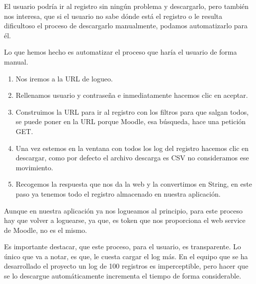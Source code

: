 El usuario podría ir al registro sin ningún problema y descargarlo, pero también nos interesa, que si el usuario no sabe dónde está el registro o le resulta dificultoso el proceso de descargarlo manualmente, podamos automatizarlo para él.
 
Lo que hemos hecho es automatizar el proceso que haría el usuario de forma manual. 
 \begin{enumerate}
 	\item 
 	Nos iremos a la URL de logueo.
 	\item 
 	Rellenamos usuario y contraseña e inmediatamente hacemos clic en aceptar.
 	\item 
 	Construimos la URL para ir al registro con los filtros para que salgan todos, se puede poner en la URL porque Moodle, esa búsqueda, hace una petición GET.
 	\item 
 	Una vez estemos en la ventana con todos los log del registro hacemos clic en descargar, como por defecto el archivo descarga es CSV no consideramos ese movimiento.
 	\item 
 	Recogemos la respuesta que nos da la web y la convertimos en String, en este paso ya tenemos todo el registro almacenado en nuestra aplicación.
 \end{enumerate}
 
Aunque en nuestra aplicación ya nos logueamos al principio, para este proceso hay que volver a loguearse, ya que, es token que nos proporciona el web service de Moodle, no es el mismo.

Es importante destacar, que este proceso, para el usuario, es transparente. Lo único que va a notar, es que, le cuesta cargar el log más. En el equipo que se ha desarrollado el proyecto un log de 100 registros es imperceptible, pero hacer que se lo descargue automáticamente incrementa el tiempo de forma considerable.
 